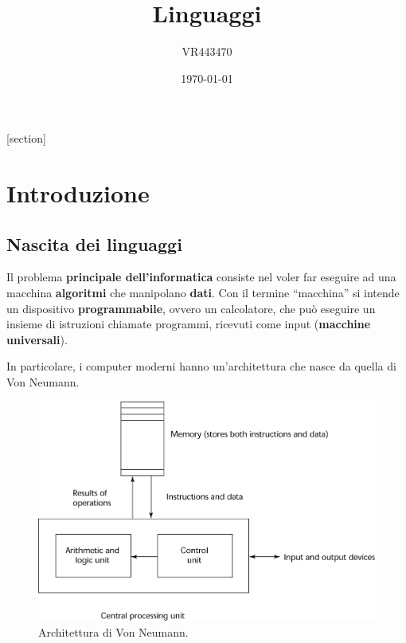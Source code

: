 \documentclass[a4paper]{article}
\newcommand{\dquotes}[1]{``#1''}
\begin{document}
	[section]
	
	
	\author{VR443470}
	\title{Linguaggi}
	\date{\printdayoff\today}
	\maketitle
	
	\newpage
	
	\tableofcontents
	
	\newpage
	
	\section{Introduzione}
	
	\subsection{Nascita dei linguaggi}
	
	Il problema \textbf{principale dell'informatica} consiste nel voler far eseguire ad una macchina \textbf{algoritmi} che manipolano \textbf{dati}. Con il termine \dquotes{macchina} si intende un dispositivo \textbf{programmabile}, ovvero un calcolatore, che può eseguire un insieme di istruzioni chiamate programmi, ricevuti come input (\textcolor{Red3}{\textbf{macchine universali}}).\newline
	
	\noindent
	In particolare, i computer moderni hanno un'architettura che nasce da quella di Von Neumann.
	\begin{figure}[!htp]
		\centering
		\includegraphics[width=\textwidth]{img/von_neumann.png}
		\caption{Architettura di Von Neumann.}
	\end{figure}
\end{document}
